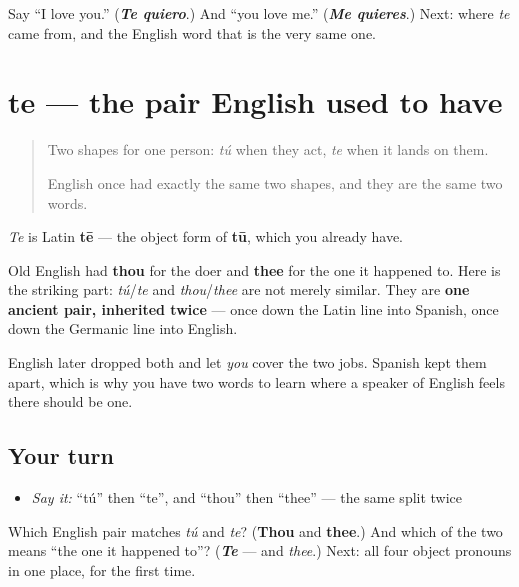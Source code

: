\begin{tcolorbox}[breakable,colback=teal!4,colframe=teal!35!black,title={Before you move on}]
Say \textquotedblleft{}I love you.\textquotedblright{} (\emph{\textbf{Te quiero}}.) And \textquotedblleft{}you love me.\textquotedblright{} (\emph{\textbf{Me quieres}}.) Next: where \emph{te} came from, and the English word that is the very same one.
\end{tcolorbox}
\section[te]{te — the pair English used to have}

\label{lesson:ES-C42-te-thee}



\begin{quote}
Two shapes for one person: \emph{tú} when they act, \emph{te} when it lands on them.

English once had exactly the same two shapes, and they are the same two words.
\end{quote}

\begin{cousinweb}
\emph{Te} is Latin \textbf{tē} — the object form of \textbf{tū}, which you already have.

Old English had \textbf{thou} for the doer and \textbf{thee} for the one it happened to. Here is the striking part: \emph{tú}/\emph{te} and \emph{thou}/\emph{thee} are not merely similar. They are \textbf{one ancient pair, inherited twice} — once down the Latin line into Spanish, once down the Germanic line into English.

English later dropped both and let \emph{you} cover the two jobs. Spanish kept them apart, which is why you have two words to learn where a speaker of English feels there should be one.
\end{cousinweb}

\subsection*{Your turn}
\begin{itemize}
\raggedright
  \item \emph{Say it:} \textquotedblleft{}tú\textquotedblright{} then \textquotedblleft{}te\textquotedblright{}, and \textquotedblleft{}thou\textquotedblright{} then \textquotedblleft{}thee\textquotedblright{} — the same split twice
\end{itemize}

\begin{tcolorbox}[breakable,colback=teal!4,colframe=teal!35!black,title={Before you move on}]
Which English pair matches \emph{tú} and \emph{te}? (\textbf{Thou} and \textbf{thee}.) And which of the two means \textquotedblleft{}the one it happened to\textquotedblright{}? (\emph{\textbf{Te}} — and \emph{thee}.) Next: all four object pronouns in one place, for the first time.
\end{tcolorbox}
